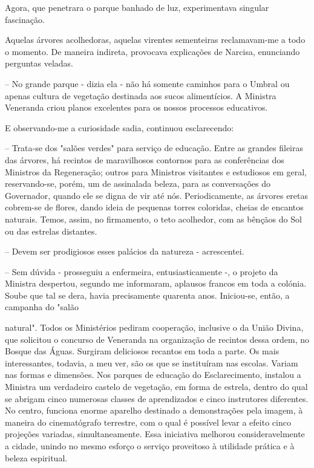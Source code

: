 \documentclass[portuguese,12pt,a4paper]{scrbook}
\begin{document}
	Agora, que penetrara o parque banhado de luz, experimentava singular fascinação.
	
	Aquelas árvores acolhedoras, aquelas virentes sementeiras reclamavam-me a todo o momento. De maneira indireta, provocava explicações de Narcisa, enunciando perguntas veladas.
	
	– No grande parque - dizia ela - não há somente caminhos para o Umbral ou apenas cultura de vegetação destinada aos sucos alimentícios. A Ministra Veneranda criou planos excelentes para os nossos processos educativos.
	
	E observando-me a curiosidade sadia, continuou esclarecendo:
	
	– Trata-se dos "salões verdes" para serviço de educação. Entre as grandes fileiras das árvores, há recintos de maravilhosos contornos para as conferências dos Ministros da Regeneração; outros para Ministros visitantes e estudiosos em geral, reservando-se, porém, um de assinalada beleza, para as conversações do Governador, quando ele se digna de vir até nós. Periodicamente, as árvores eretas cobrem-se de flores, dando ideia de pequenas torres coloridas, cheias de encantos naturais. Temos, assim, no firmamento, o teto acolhedor, com as bênçãos do Sol ou das estrelas distantes.
	
	– Devem ser prodigiosos esses palácios da natureza - acrescentei.
	
	– Sem dúvida - prosseguiu a enfermeira, entusiasticamente -, o projeto da Ministra despertou, segundo me informaram, aplausos francos em toda a colónia. Soube que tal se dera, havia precisamente quarenta anos. Iniciou-se, então, a campanha do "salão
	
	
	natural". Todos os Ministérios pediram cooperação, inclusive o da União Divina, que solicitou o concurso de Veneranda na organização de recintos dessa ordem, no Bosque das Águas. Surgiram deliciosos recantos em toda a parte. Os mais interessantes, todavia, a meu ver, são os que se instituíram nas escolas. Variam nas formas e dimensões. Nos parques de educação do Esclarecimento, instalou a Ministra um verdadeiro castelo de vegetação, em forma de estrela, dentro do qual se abrigam cinco numerosas classes de aprendizados e cinco instrutores diferentes. No centro, funciona enorme aparelho destinado a demonstrações pela imagem, à maneira do cinematógrafo terrestre, com o qual é possível levar a efeito cinco projeções variadas, simultaneamente. Essa iniciativa melhorou consideravelmente a cidade, unindo no mesmo esforço o serviço proveitoso à utilidade prática e à beleza espiritual.
	
\end{document}
